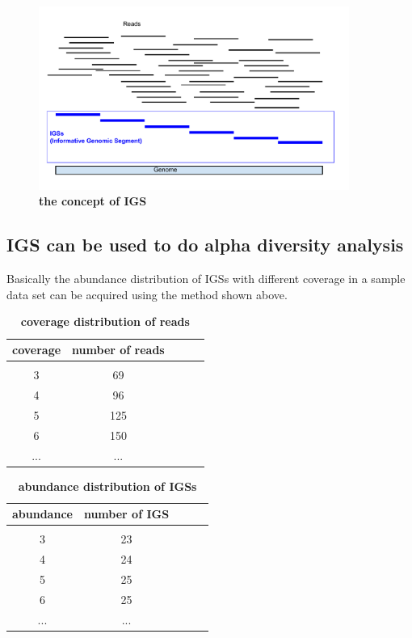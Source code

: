\begin{figure}[!ht]
\centerline{\includegraphics[width=4in]{./figures/IGSs_figure.pdf}}
\caption{\bf the concept of IGS}
\label{fig:IGS}
\end{figure}





\subsection{IGS can be used to do alpha diversity analysis}

Basically the abundance distribution of IGSs with different coverage in a 
sample data set can be acquired using the method shown above.



\begin{table}[!ht]
\caption{
\bf{coverage distribution of reads}
}
\begin{tabular}{ |c | c |c| c|c| }
coverage & number of reads \\
\hline \\
3                   & 69  \\
4                  & 96  \\
5                  & 125 \\
6        & 150 \\
...        & ... \\
\end{tabular}
\begin{flushleft}
\end{flushleft}
\label{table:coverage_reads}
\end{table}


\begin{table}[!ht]
\caption{
\bf{abundance distribution of IGSs}
}
\begin{tabular}{ |c | c |c| c|c| }
abundance & number of IGS \\
\hline \\
3                   & 23  \\
4                  & 24  \\
5                  & 25 \\
6        & 25 \\
...        & ... \\
\end{tabular}
\begin{flushleft}
\end{flushleft}
\label{table:coverage_IGS}
\end{table}

